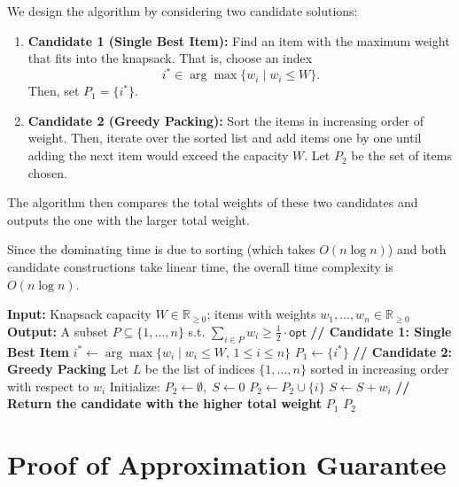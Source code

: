 \documentclass[letterpaper, 11pt]{article}
\newcommand{\1}{\mathds{1}}	%
\theoremstyle{definition}
\newenvironment{solution}{{\par\noindent\it Solution.}}{}
\begin{document}
\begin{solution}
We design the algorithm by considering two candidate solutions:
\begin{enumerate}
    \item \textbf{Candidate 1 (Single Best Item):} Find an item with the maximum weight that fits into the knapsack. That is, choose an index
    \[
    i^* \in \arg\max \{ w_i \mid w_i \le W \}.
    \]
    Then, set \(P_1 = \{i^*\}\).
    \item \textbf{Candidate 2 (Greedy Packing):} Sort the items in increasing order of weight. Then, iterate over the sorted list and add items one by one until adding the next item would exceed the capacity \(W\). Let \(P_2\) be the set of items chosen.
\end{enumerate}

The algorithm then compares the total weights of these two candidates and outputs the one with the larger total weight.

Since the dominating time is due to sorting (which takes \(O(n \log n)\)) and both candidate constructions take linear time, the overall time complexity is \(O(n \log n)\).


\begin{algorithm}
\caption{\(\textsc{ApprxKnapsack}(W, w_1,\dots, w_n)\)}
\begin{algorithmic}[1]
\State \textbf{Input:} Knapsack capacity \(W \in \mathbb{R}_{\geq 0}\); items with weights \(w_1,\dots,w_n \in \mathbb{R}_{\geq 0}\)
\State \textbf{Output:} A subset \(P \subseteq \{1,\dots,n\}\) s.t. \(\sum_{i\in P} w_i \ge \frac{1}{2}\cdot\mathsf{opt}\)
\medskip
\State \textbf{// Candidate 1: Single Best Item}
\State \(i^* \gets \arg\max \{w_i \mid w_i \le W,\, 1\le i \le n\}\)
\State \(P_1 \gets \{ i^* \}\)  
\medskip
\State \textbf{// Candidate 2: Greedy Packing}
\State Let \(L\) be the list of indices \(\{1,\dots,n\}\) sorted in increasing order with respect to \(w_i\)
\State Initialize: \(P_2 \gets \emptyset,\; S \gets 0\)
        \State \(P_2 \gets P_2 \cup \{i\}\)
        \State \(S \gets S+w_i\)
    \EndIf
\EndFor
\medskip
\State \textbf{// Return the candidate with the higher total weight}
    \State \Return \(P_1\)
\Else
    \State \Return \(P_2\)
\EndIf
\end{algorithmic}
\end{algorithm}

\section*{Proof of Approximation Guarantee}


\end{solution}
\end{document}
